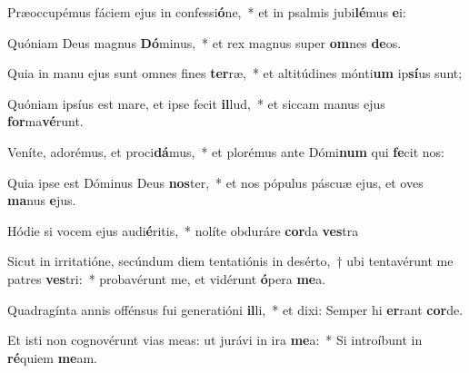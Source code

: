 \item Præoccupémus fáciem ejus in confessi\textbf{ó}ne,~* et in psalmis jubi\textbf{lé}mus \textbf{e}i:
\item Quóniam Deus magnus \textbf{Dó}minus,~* et rex magnus super \textbf{om}nes \textbf{de}os.
\item Quia in manu ejus sunt omnes fines \textbf{ter}ræ,~* et altitúdines mónti\textbf{um} ip\textbf{sí}us sunt;
\item Quóniam ipsíus est mare, et ipse fecit \textbf{il}lud,~* et siccam manus ejus \textbf{for}ma\textbf{vé}runt.
\item Veníte, adorémus, et proci\textbf{dá}mus,~* et plorémus ante Dómi\textbf{num} qui \textbf{fe}cit nos:
\item Quia ipse est Dóminus Deus \textbf{nos}ter,~* et nos pópulus páscuæ ejus, et oves \textbf{ma}nus \textbf{e}jus.
\item Hódie si vocem ejus audi\textbf{é}ritis,~* nolíte obduráre \textbf{cor}da \textbf{ves}tra
\item Sicut in irritatióne, secúndum diem tentatiónis in desérto,~† ubi tentavérunt me patres \textbf{ves}tri:~* probavérunt me, et vidérunt \textbf{ó}pera \textbf{me}a.
\item Quadragínta annis offénsus fui generatióni \textbf{il}li,~* et dixi: Semper hi \textbf{er}rant \textbf{cor}de.
\item Et isti non cognovérunt vias meas: ut jurávi in ira \textbf{me}a:~* Si introíbunt in \textbf{ré}quiem \textbf{me}am.
